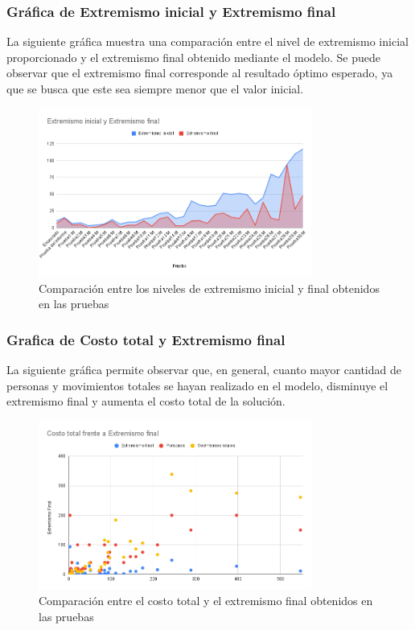 \documentclass[11pt,letter]{article}
\begin{document}
\subsubsection*{Gráfica de Extremismo inicial y Extremismo final}
La siguiente gráfica muestra una comparación entre el nivel de extremismo inicial proporcionado y el extremismo final obtenido mediante el modelo. Se puede observar que el extremismo final corresponde al resultado óptimo esperado, ya que se busca que este sea siempre menor que el valor inicial.
\begin{figure}[H]
    \centering
    \includegraphics[width=0.8\textwidth]{resources/extremismoiyf.png}
    \caption{Comparación entre los niveles de extremismo inicial y final obtenidos en las pruebas}
\end{figure}

\subsubsection*{Grafica de Costo total y Extremismo final}
La siguiente gráfica permite observar que, en general, cuanto mayor cantidad de personas y movimientos totales se hayan realizado en el modelo, disminuye el extremismo final y aumenta el costo total de la solución.

\begin{figure}[H]
    \centering
    \includegraphics[width=0.8\textwidth]{resources/costototalvsextremismofinal.png}
    \caption{Comparación entre el costo total y el extremismo final obtenidos en las pruebas}
\end{figure}
\end{document}
